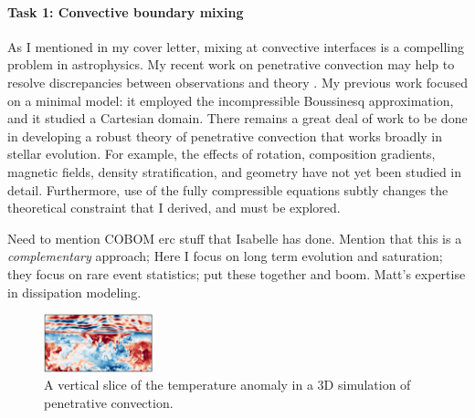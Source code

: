\documentclass[12pt]{article}
\begin{document}
\paragraph*{Task 1: Convective boundary mixing}
As I mentioned in my cover letter, mixing at convective interfaces is a compelling problem in astrophysics.
My recent work on penetrative convection may help to resolve discrepancies between observations and theory \citep{anders_etal_2022a}.
My previous work focused on a minimal model: it employed the incompressible Boussinesq approximation, and it studied a Cartesian domain.
There remains a great deal of work to be done in developing a robust theory of penetrative convection that works broadly in stellar evolution.
For example, the effects of rotation, composition gradients, magnetic fields, density stratification, and geometry have not yet been studied in detail.
Furthermore, use of the fully compressible equations subtly changes the theoretical constraint that I derived, and must be explored.

Need to mention COBOM erc stuff that Isabelle has done.
Mention that this is a \emph{complementary} approach; Here I focus on long term evolution and saturation; they focus on rare event statistics; put these together and boom.
Matt's expertise in dissipation modeling.

\begin{figure}
	\begin{center}
	\vspace{-10pt}
    \includegraphics[width=0.28\textwidth]{./figs/penconv.png}
	\vspace{-16pt}
	\end{center}
    \caption{ A vertical slice of the temperature anomaly in a 3D simulation of penetrative convection.
	\label{fig:penconv} }
\end{figure}
\end{document}

